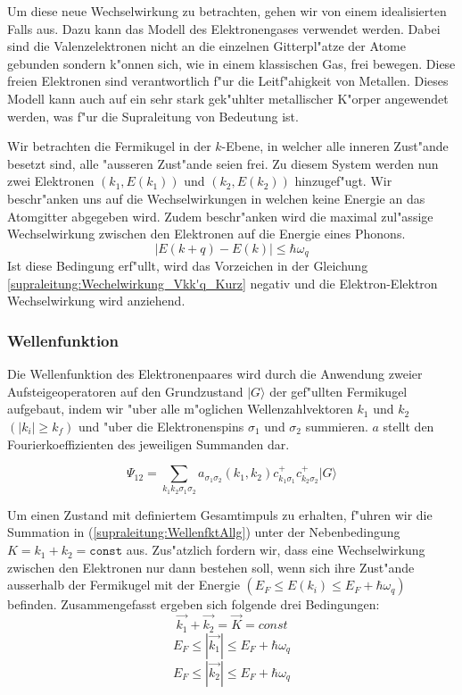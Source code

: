 \begin{refsection}
Um diese neue Wechselwirkung zu betrachten, gehen wir von einem idealisierten Falls aus.
Dazu kann das Modell des Elektronengases verwendet werden.
Dabei sind die Valenzelektronen nicht an die einzelnen Gitterpl"atze der Atome gebunden sondern k"onnen sich,
wie in einem klassischen Gas, frei bewegen.
Diese freien Elektronen sind verantwortlich f"ur die Leitf"ahigkeit von Metallen.
Dieses Modell kann auch auf ein sehr stark gek"uhlter metallischer K"orper angewendet werden,
was f"ur die Supraleitung von Bedeutung ist.

Wir betrachten die Fermikugel in der $k$-Ebene, in welcher alle inneren Zust"ande besetzt sind,
alle "ausseren Zust"ande seien frei.
Zu diesem System werden nun zwei Elektronen $(k_1,E(k_1))$ und $(k_2,E(k_2))$ hinzugef"ugt.
Wir beschr"anken uns auf die Wechselwirkungen in welchen keine Energie an das Atomgitter abgegeben wird.
Zudem beschr"anken wird die maximal zul"assige Wechselwirkung zwischen den Elektronen auf die
Energie eines Phonons.
\begin{equation}
|E(k+q)-E(k)|\le\hbar\omega_q
\label{supraleitung:Phonon Energie}
\end{equation}
Ist diese Bedingung erf"ullt, wird das Vorzeichen in der Gleichung \ref{supraleitung:Wechelwirkung_Vkk'q_Kurz} negativ und die Elektron-Elektron Wechselwirkung wird anziehend.

\subsubsection{Wellenfunktion}
Die Wellenfunktion des Elektronenpaares wird durch die Anwendung zweier Aufsteigeoperatoren
auf den Grundzustand $|G\rangle$ der gef"ullten Fermikugel aufgebaut, indem wir "uber
alle m"oglichen Wellenzahlvektoren $k_1$ und $k_2$ $(|k_i| \ge k_f)$ und "uber
die Elektronenspins $\sigma_1$ und $\sigma_2$ summieren.
$a$ stellt den Fourierkoeffizienten des jeweiligen Summanden dar.

\begin{equation}
\Psi_{12}=\sum \limits_{k_1k_2\sigma_1\sigma_2} a_{\sigma_1\sigma_2}
(k_1,k_2)c^+_{k_1\sigma_1}c^+_{k_2\sigma_2}|G\rangle
\label{supraleitung:WellenfktAllg}
\end{equation}

Um einen Zustand mit definiertem Gesamtimpuls zu erhalten, f"uhren wir die Summation in
(\ref{supraleitung:WellenfktAllg}) unter der Nebenbedingung $K=k_1+k_2=\texttt{const}$ aus.
Zus"atzlich fordern wir, dass eine Wechselwirkung zwischen den Elektronen nur dann bestehen soll,
wenn sich ihre Zust"ande ausserhalb der Fermikugel mit der Energie
$(E_F \le E(k_i) \le E_F+\hbar\omega_q)$ befinden.
Zusammengefasst ergeben sich folgende drei Bedingungen:
\[
\overrightarrow{k_1}+\overrightarrow{k_2}=\overrightarrow{K}=const
\]
\[
E_F\le|\overrightarrow{k_1}|\le E_F+\hbar\omega_q
\]
\[
E_F\le|\overrightarrow{k_2}|\le E_F+\hbar\omega_q
\]

\end{refsection}
